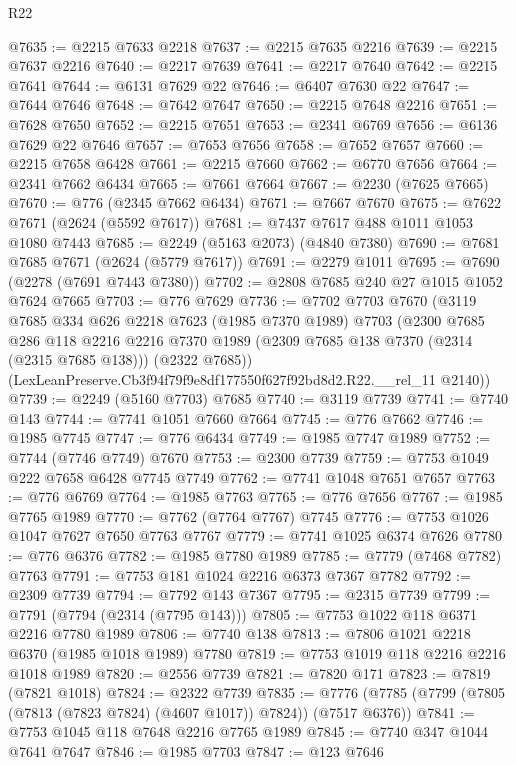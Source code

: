 \begin{lexlean}{R22}
\begin{coremodule}
@7635 := @2215 @7633 @2218
@7637 := @2215 @7635 @2216
@7639 := @2215 @7637 @2216
@7640 := @2217 @7639
@7641 := @2217 @7640
@7642 := @2215 @7641
@7644 := @6131 @7629 @22
@7646 := @6407 @7630 @22
@7647 := @7644 @7646
@7648 := @7642 @7647
@7650 := @2215 @7648 @2216
@7651 := @7628 @7650
@7652 := @2215 @7651
@7653 := @2341 @6769
@7656 := @6136 @7629 @22 @7646
@7657 := @7653 @7656
@7658 := @7652 @7657
@7660 := @2215 @7658 @6428
@7661 := @2215 @7660
@7662 := @6770 @7656
@7664 := @2341 @7662 @6434
@7665 := @7661 @7664
@7667 := @2230 (@7625 @7665)
@7670 := @776 (@2345 @7662 @6434)
@7671 := @7667 @7670
@7675 := @7622 @7671 (@2624 (@5592 @7617))
@7681 := @7437 @7617 @488 @1011 @1053 @1080 @7443
@7685 := @2249 (@5163 @2073) (@4840 @7380)
@7690 := @7681 @7685 @7671 (@2624 (@5779 @7617))
@7691 := @2279 @1011
@7695 := @7690 (@2278 (@7691 @7443 @7380))
@7702 := @2808 @7685 @240 @27 @1015 @1052 @7624 @7665
@7703 := @776 @7629
@7736 := @7702
    @7703
    @7670
    (@3119
      @7685
      @334
      @626
      @2218
      @7623
      (@1985 @7370 @1989)
      @7703
      (@2300
        @7685
        @286
        @118
        @2216
        @2216
        @7370
        @1989
        (@2309 @7685 @138 @7370 (@2314 (@2315 @7685 @138)))
        (@2322 @7685))
      (LexLeanPreserve.Cb3f94f79f9e8df177550f627f92bd8d2.R22.__rel_11 @2140))
@7739 := @2249 (@5160 @7703) @7685
@7740 := @3119 @7739
@7741 := @7740 @143
@7744 := @7741 @1051 @7660 @7664
@7745 := @776 @7662
@7746 := @1985 @7745
@7747 := @776 @6434
@7749 := @1985 @7747 @1989
@7752 := @7744 (@7746 @7749) @7670
@7753 := @2300 @7739
@7759 := @7753 @1049 @222 @7658 @6428 @7745 @7749
@7762 := @7741 @1048 @7651 @7657
@7763 := @776 @6769
@7764 := @1985 @7763
@7765 := @776 @7656
@7767 := @1985 @7765 @1989
@7770 := @7762 (@7764 @7767) @7745
@7776 := @7753 @1026 @1047 @7627 @7650 @7763 @7767
@7779 := @7741 @1025 @6374 @7626
@7780 := @776 @6376
@7782 := @1985 @7780 @1989
@7785 := @7779 (@7468 @7782) @7763
@7791 := @7753 @181 @1024 @2216 @6373 @7367 @7782
@7792 := @2309 @7739
@7794 := @7792 @143 @7367
@7795 := @2315 @7739
@7799 := @7791 (@7794 (@2314 (@7795 @143)))
@7805 := @7753 @1022 @118 @6371 @2216 @7780 @1989
@7806 := @7740 @138
@7813 := @7806 @1021 @2218 @6370 (@1985 @1018 @1989) @7780
@7819 := @7753 @1019 @118 @2216 @2216 @1018 @1989
@7820 := @2556 @7739
@7821 := @7820 @171
@7823 := @7819 (@7821 @1018)
@7824 := @2322 @7739
@7835 := @7776 (@7785 (@7799 (@7805 (@7813 (@7823 @7824) (@4607 @1017)) @7824)) (@7517 @6376))
@7841 := @7753 @1045 @118 @7648 @2216 @7765 @1989
@7845 := @7740 @347 @1044 @7641 @7647
@7846 := @1985 @7703
@7847 := @123 @7646

\end{coremodule}
\end{lexlean}
